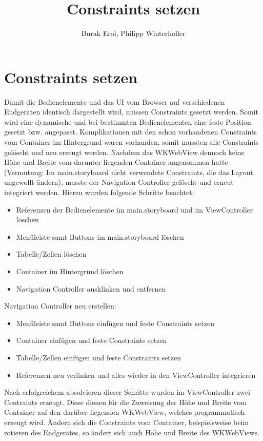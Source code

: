 
\title{Constraints setzen}
\author{Burak Erol, Philipp Winterholler}

\section{Constraints setzen}

Damit die Bedienelemente und das UI vom Browser auf verschiedenen Endgeräten identisch dargestellt wird, müssen Constraints gesetzt werden. Somit wird eine dynamische und bei bestimmten Bedienelementen eine feste Position gesetzt bzw. angepasst. Komplikationen mit den schon vorhandenen Constraints vom Container im Hintergrund waren vorhanden, somit mussten alle Constraints gelöscht und neu erzeugt werden. Nachdem das WKWebView dennoch keine Höhe und Breite vom darunter liegenden Container angenommen hatte (Vermutung: Im main.storyboard nicht verwendete Constraints, die das Layout ungewollt ändern), musste der Navigation Controller gelöscht und erneut integriert werden. Hierzu wurden folgende Schritte beachtet:

\begin{itemize}
\item Referenzen der Bedienelemente im main.storyboard und im ViewController löschen 
\item Menüleiste samt Buttons im main.storyboard löschen 
\item Tabelle/Zellen löschen
\item Container im Hintergrund löschen
\item Navigation Controller ausklinken und entfernen
\end{itemize}

Navigation Controller neu erstellen:
\begin{itemize}
\item Menüleiste samt Buttons einfügen und feste Constraints setzen
\item Container einfügen und feste Constraints setzen
\item Tabelle/Zellen einfügen und feste Constraints setzen
\item Referenzen neu verlinken und alles wieder in den ViewController integrieren
\end{itemize}

Nach erfolgreichem absolvieren dieser Schritte wurden im ViewController zwei Contraints erzeugt. Diese dienen für die Zuweisung der Höhe und Breite vom Container auf den darüber liegenden WKWebView, welches programmatisch erzeugt wird. Ändern sich die Constraints vom Container, beispielsweise beim rotieren des Endgerätes, so ändert sich auch Höhe und Breite des WKWebViews.

